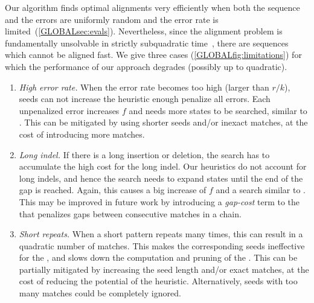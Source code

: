 Our algorithm finds optimal alignments very efficiently when both the sequence
and the errors are uniformly random and the error rate is
limited~(\cref{GLOBALsec:evals}). Nevertheless, since the alignment problem is
fundamentally unsolvable in strictly subquadratic time~\citep{backurs2015edit},
there are sequences which cannot be aligned fast. We give three cases
(\cref{GLOBALfig:limitations}) for which the performance of our approach
degrades (possibly up to quadratic).

\begin{enumerate}
  \item \emph{High error rate.}
        When the error rate becomes too high (larger
        than $r/k$), seeds can not increase the heuristic enough
        penalize all errors. Each unpenalized error increases $f$ and needs more
        states to be searched, similar to \dijkstra.
        This can be mitigated by using shorter seeds and/or inexact matches, at
        the cost of introducing more matches.
  \item \emph{Long indel.}
        If there is a long insertion or deletion, the
        search has to accumulate the high cost for the long indel.
        Our heuristics do not account for long indels, and hence the search
        needs to expand states until the end of the gap is reached. Again, this
        causes a big increase of $f$ and a search similar to \dijkstra.
        This may be improved in future work by introducing a \emph{gap-cost} term to the \csh
        that penalizes gaps between consecutive matches in a chain.
  \item \emph{Short repeats.}
        When a short pattern repeats many times, this can result in a quadratic
        number of matches. This makes the corresponding seeds ineffective for
        the \sh, and slows down the computation and pruning of the \csh.
        This can be partially mitigated by increasing the seed length and/or
        exact matches, at the cost of reducing the potential of the heuristic.
        Alternatively, seeds with too many matches could be completely ignored.
\end{enumerate}
